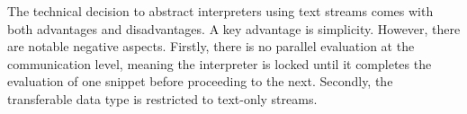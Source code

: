 \documentclass[letterpaper,12pt,twocolumn]{article}
\begin{document}
\begin{comment}

Lets write the "Discussion" section. of the paper. Please check the grammar of
the following points and make a linked narrative out of them. Please use Latex
markup.

---

The technical decision to abstract interpreters using text streams has its
positive and negative sides. While simplicity is the obvious bonus, the negatvie
consequences can be groouped into (1) No parallel evaluation at the
communication level. Th interpreter gets locked until it finishes evaluation of
one snippet before it can proceed to another one. (2) Transferrable data type is
limited to text-only streams.

We argue that the lack of parallel execution at the communication level can be
compensated by using interpreter-specific parallelism where and if it is
supported. For example, Python programs can use all sort of subprocess
utilities while shell programs have full access to shell job control.

Restricting streams to text-only data type seems to be a more funcdamental
limitation. Litrepl lifts this limitation by supporting text-only document
formats. Both Latex and Markdown have means of including rich data but they
don't encode these data directly. Instead they rely on side channels: file
system or network for referring such objects. Litrepl shares both pros such as
good representation in well-known version control systems, and cons, e.g.
requirement to organize such a side-channel data transfer explicitly.

Another controversial technical solution - to transfer the whole document at
input and output - can have performance penalties. In our experience the system
works sufficienlty good for few-thousand line documents, but for larger
documents delays might become uncomfortable even on modern computers. Still we
prefer to keep this interface to make editor integration as simple as possible:
typical plugin can just pipe the whole document through the tool using few lines
of code.

In addition, we allow a more performant integrations which take responsibility
for pre-parsing and piping only the relevant parts of the document. For these
approach, Litrepl offers \verb|print-regexp| command printing the anchor regexp
in a few common formats.
\end{comment}

The technical decision to abstract interpreters using text streams comes with
both advantages and disadvantages. A key advantage is simplicity. However, there
are notable negative aspects. Firstly, there is no parallel evaluation at the
communication level, meaning the interpreter is locked until it completes the
evaluation of one snippet before proceeding to the next. Secondly, the
transferable data type is restricted to text-only streams.
\end{document}
